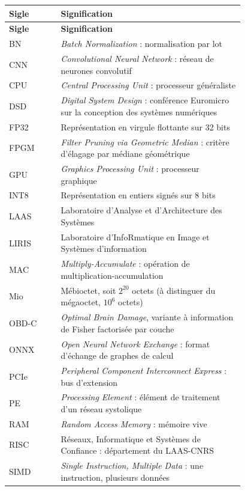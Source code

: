 \documentclass[11pt,a4paper]{report}
\begin{document}
\begin{longtable}{@{}l>{\raggedright\arraybackslash}p{0.78\linewidth}@{}}
\toprule
\textbf{Sigle} & \textbf{Signification} \\
\midrule
\endfirsthead
\toprule
\textbf{Sigle} & \textbf{Signification} \\
\midrule
\endhead
BN        & \emph{Batch Normalization} : normalisation par lot \\
CNN       & \emph{Convolutional Neural Network} : réseau de neurones convolutif \\
CPU       & \emph{Central Processing Unit} : processeur généraliste \\
DSD       & \emph{Digital System Design} : conférence Euromicro sur la conception des systèmes numériques \\
FP32      & Représentation en virgule flottante sur 32 bits \\
FPGM      & \emph{Filter Pruning via Geometric Median} : critère d'élagage par médiane géométrique \\
GPU       & \emph{Graphics Processing Unit} : processeur graphique \\
INT8      & Représentation en entiers signés sur 8 bits \\
LAAS      & Laboratoire d'Analyse et d'Architecture des Systèmes \\
LIRIS     & Laboratoire d'InfoRmatique en Image et Systèmes d'information \\
MAC       & \emph{Multiply-Accumulate} : opération de multiplication-accumulation \\
Mio       & Mébioctet, soit $2^{20}$ octets (à distinguer du mégaoctet, $10^{6}$ octets) \\
OBD-C     & \emph{Optimal Brain Damage}, variante à information de Fisher factorisée par couche \\
ONNX      & \emph{Open Neural Network Exchange} : format d'échange de graphes de calcul \\
PCIe      & \emph{Peripheral Component Interconnect Express} : bus d'extension \\
PE        & \emph{Processing Element} : élément de traitement d'un réseau systolique \\
RAM       & \emph{Random Access Memory} : mémoire vive \\
RISC      & Réseaux, Informatique et Systèmes de Confiance : département du LAAS-CNRS \\
SIMD      & \emph{Single Instruction, Multiple Data} : une instruction, plusieurs données \\

\end{longtable}
\end{document}
